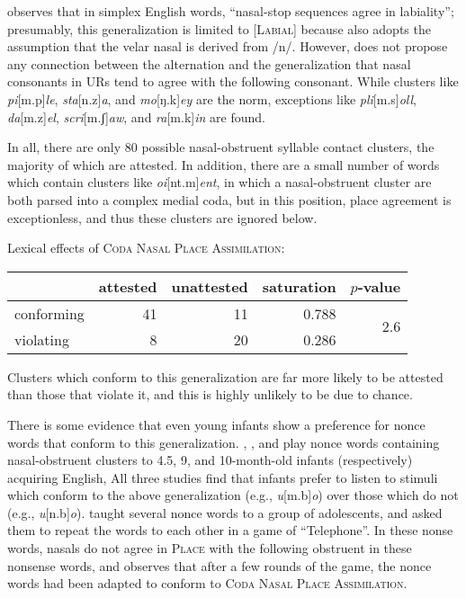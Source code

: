 \citet[][175]{Pierrehumbert1994} observes that in simplex English words, ``nasal-stop sequences agree in labiality''; presumably, this generalization is limited to [\textsc{Labial}] because \citeauthor{Pierrehumbert1994} also adopts the assumption that the velar nasal is derived from /n/. However, \citeauthor{Pierrehumbert1994} does not propose any connection between the alternation and the generalization that nasal consonants in URs tend to agree with the following consonant. While clusters like \emph{pi}[m.p]\emph{le}, \emph{sta}[n.z]\emph{a}, and \emph{mo}[ŋ.k]\emph{ey} are the norm, exceptions like \emph{pli}[m.s]\emph{oll}, \emph{da}[m.z]\emph{el}, \emph{scri}[m.ʃ]\emph{aw}, and \emph{ra}[m.k]\emph{in} are found.

In all, there are only 80 possible nasal-obstruent syllable contact clusters, the majority of which are attested. In addition, there are a small number of words which contain clusters like \emph{oi}[nt.m]\emph{ent}, in which a nasal-obstruent cluster are both parsed into a complex medial coda, but in this position, place agreement is exceptionless, and thus these clusters are ignored below.

\ex Lexical effects of \textsc{Coda Nasal Place Assimilation}: \vspace{6pt} \\
\begin{tabular}{l r r r r}
\toprule
           & attested & unattested & saturation & $p$-value \\
\midrule
conforming & 41 & 11 & 0.788 & \multirow{2}{*}{2.6\e{-05}}\\
violating  & 8  & 20 & 0.286 \\
\bottomrule
\end{tabular}
\xe

\noindent
Clusters which conform to this generalization are far more likely to be attested than those that violate it, and this is highly unlikely to be due to chance.

There is some evidence that even young infants show a preference for nonce words that conform to this generalization. \citet{Jusczyk2003}, \citet{Mattys1999}, and \citet{Jusczyk2002} play nonce words containing nasal-obstruent clusters to 4.5, 9, and 10-month-old infants (respectively) acquiring English, All three studies find that infants prefer to listen to stimuli which conform to the above generalization (e.g., \emph{u}[m.b]\emph{o}) over those which do not (e.g., \emph{u}[n.b]\emph{o}). \citet{Wright1975} taught several nonce words to a group of adolescents, and asked them to repeat the words to each other in a game of ``Telephone''. In these nonse words, nasals do not agree in \textsc{Place} with the following obstruent in these nonsense words, and \citeauthor{Wright1975} observes that after a few rounds of the game, the nonce words had been adapted to conform to \textsc{Coda Nasal Place Assimilation}.

